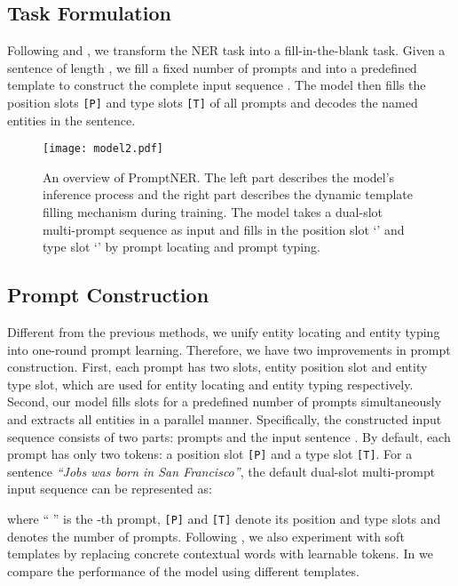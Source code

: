 \documentclass[11pt]{article}
\newcommand*{\img}[1]{\raisebox{-.2\baselineskip}{\texttt{[image: \#1]}}}
\begin{document}
\subsection{Task Formulation}
\label{3.1}

Following \citet{cui-etal-2021-template} and \citet{lee-etal-2022-good}, we transform the NER task into a fill-in-the-blank task. Given a sentence  of length , we fill a fixed number  of prompts and  into a predefined template to construct the complete input sequence . The model then fills the position slots \texttt{[P]} and type slots \texttt{[T]} of all prompts and decodes the named entities in the sentence.


\begin{figure*}
    \centering
    \texttt{[image: model2.pdf]}
    \caption{An overview of PromptNER. The left part describes the model's inference process and the right part describes the dynamic template filling mechanism during training. The model takes a dual-slot multi-prompt sequence as input and fills in the position slot `\img{lan.pdf}' and type slot `\img{huang.pdf}'  by prompt locating and prompt typing.}
    \label{fig:model}
\end{figure*}

\subsection{Prompt Construction}
\label{3.2}


Different from the previous methods, we unify entity locating and entity typing into one-round prompt learning. Therefore, we have two improvements in prompt construction. First, each prompt has two slots, entity position slot and entity type slot, which are used for entity locating and entity typing respectively. Second, our model fills slots for a predefined number of prompts simultaneously and extracts all entities in a parallel manner.
Specifically, the constructed input sequence consists of two parts:  prompts and the input sentence . By default, each prompt has only two tokens: a position slot \texttt{[P]} and a type slot \texttt{[T]}. For a sentence \textit{``Jobs was born in San Francisco''}, the default dual-slot multi-prompt input sequence can be represented as:


\noindent where `` '' is 
 the -th prompt, \texttt{[P]} and \texttt{[T]} denote its position and type slots and  denotes the number of prompts. Following \citet{lester-etal-2021-power, gao-etal-2021-making}, we also experiment with soft templates by replacing concrete contextual words with learnable tokens. In  we compare the performance of the model using different templates.
\end{document}

